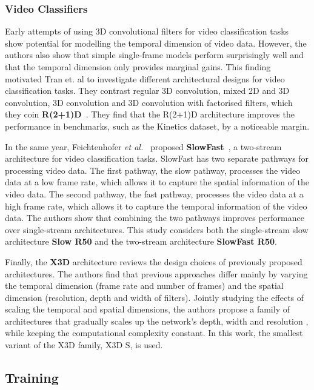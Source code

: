 \documentclass[a4paper]{article}
\begin{document}
\subsubsection{Video Classifiers} %

Early attempts of using 3D convolutional filters for video classification
tasks~\cite{i3d, c3d} show potential for modelling the temporal dimension of
video data. However, the authors also show that simple single-frame models
perform surprisingly well and that the temporal dimension only provides marginal
gains. This finding motivated Tran et. al to investigate different architectural
designs for video classification tasks. They contrast regular 3D convolution,
mixed 2D and 3D convolution, 3D convolution and 3D convolution with factorised
filters, which they coin \textbf{R(2+1)D}~\cite{r2plus1d}. They find that the
R(2+1)D architecture improves the performance in benchmarks, such as the
Kinetics dataset, by a noticeable margin. 

In the same year, Feichtenhofer \textit{et al.}~\cite{slowfast} proposed
\textbf{SlowFast}~\cite{slowfast}, a two-stream architecture for video
classification tasks. SlowFast has two separate pathways for processing video
data. The first pathway, the slow pathway, processes the video data at a low
frame rate, which allows it to capture the spatial information of the video
data. The second pathway, the fast pathway, processes the video data at a high
frame rate, which allows it to capture the temporal information of the video
data. The authors show that combining the two pathways improves performance over
single-stream architectures. This study considers both the single-stream slow
architecture \textbf{Slow R50} and the two-stream architecture \textbf{SlowFast
R50}.

Finally, the \textbf{X3D} architecture reviews the design choices of previously
proposed architectures. The authors find that previous approaches differ mainly
by varying the temporal dimension (frame rate and number of frames) and the
spatial dimension (resolution, depth and width of filters). Jointly studying the
effects of scaling the temporal and spatial dimensions, the authors propose a
family of architectures that gradually scales up the network's depth, width and
resolution , while keeping the computational complexity constant. In this work,
the smallest variant of the X3D family, X3D S, is used.


\subsection{Training} %
\label{sub:training}
\end{document}
